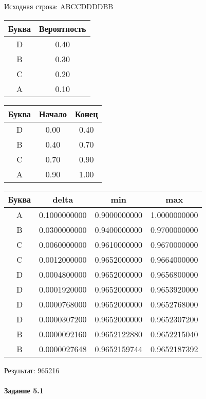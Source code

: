 \documentclass[a4paper, 12pt]{article}
\begin{document}
Исходная строка: ABCCDDDDBB\
\begin{center}
 \begin{tabular}{ |c|c| } 
  \hline
     Буква & Вероятность \\ \hline
D & 0.40\\\hline
B & 0.30\\\hline
C & 0.20\\\hline
A & 0.10
\\ \hline \end{tabular}
\end{center}
\begin{center}
 \begin{tabular}{ |c|c|c| } 
  \hline
     Буква & Начало & Конец \\ \hline
D & 0.00 & 0.40\\\hline
B & 0.40 & 0.70\\\hline
C & 0.70 & 0.90\\\hline
A & 0.90 & 1.00
\\ \hline \end{tabular}
\end{center}
\begin{center}
 \begin{tabular}{ |c|c|c|c| } 
  \hline
     Буква & delta & min & max \\ \hline
A & 0.1000000000 & 0.9000000000 & 1.0000000000\\\hline
B & 0.0300000000 & 0.9400000000 & 0.9700000000\\\hline
C & 0.0060000000 & 0.9610000000 & 0.9670000000\\\hline
C & 0.0012000000 & 0.9652000000 & 0.9664000000\\\hline
D & 0.0004800000 & 0.9652000000 & 0.9656800000\\\hline
D & 0.0001920000 & 0.9652000000 & 0.9653920000\\\hline
D & 0.0000768000 & 0.9652000000 & 0.9652768000\\\hline
D & 0.0000307200 & 0.9652000000 & 0.9652307200\\\hline
B & 0.0000092160 & 0.9652122880 & 0.9652215040\\\hline
B & 0.0000027648 & 0.9652159744 & 0.9652187392
\\ \hline \end{tabular}
\end{center}
Результат: 965216
\pagebreak
\paragraph{Задание 5.1 \\
}
\end{document}
